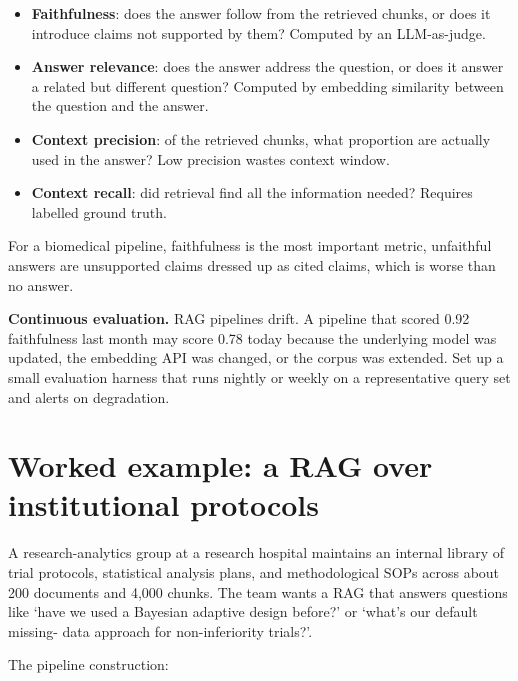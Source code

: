 \documentclass[
  letterpaper,
  11pt]{scrbook}
\providecommand{\tightlist}{%
  \setlength{\itemsep}{0pt}\setlength{\parskip}{0pt}}
\begin{document}
\begin{itemize}
\tightlist
\item
  \textbf{Faithfulness}: does the answer follow from the retrieved
  chunks, or does it introduce claims not supported by them? Computed by
  an LLM-as-judge.
\item
  \textbf{Answer relevance}: does the answer address the question, or
  does it answer a related but different question? Computed by embedding
  similarity between the question and the answer.
\item
  \textbf{Context precision}: of the retrieved chunks, what proportion
  are actually used in the answer? Low precision wastes context window.
\item
  \textbf{Context recall}: did retrieval find all the information
  needed? Requires labelled ground truth.
\end{itemize}

For a biomedical pipeline, faithfulness is the most important metric,
unfaithful answers are unsupported claims dressed up as cited claims,
which is worse than no answer.

\textbf{Continuous evaluation.} RAG pipelines drift. A pipeline that
scored 0.92 faithfulness last month may score 0.78 today because the
underlying model was updated, the embedding API was changed, or the
corpus was extended. Set up a small evaluation harness that runs nightly
or weekly on a representative query set and alerts on degradation.

\section{Worked example: a RAG over institutional
protocols}\label{worked-example-a-rag-over-institutional-protocols}

A research-analytics group at a research hospital maintains an internal
library of trial protocols, statistical analysis plans, and
methodological SOPs across about 200 documents and 4,000 chunks. The
team wants a RAG that answers questions like `have we used a Bayesian
adaptive design before?' or `what's our default missing- data approach
for non-inferiority trials?'.

The pipeline construction:
\end{document}
